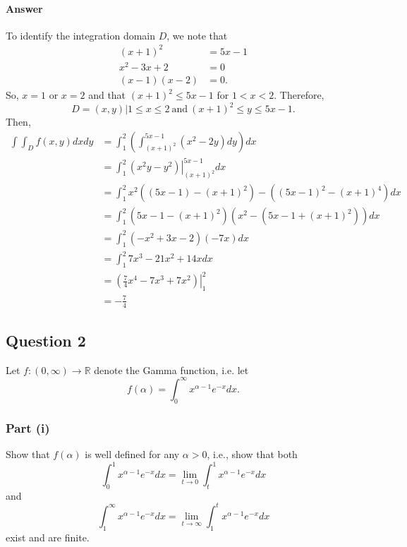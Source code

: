 \paragraph{Answer}
To identify the integration domain $ D $, we note that
\begin{align*}
    (x + 1)^2 &= 5 x - 1 \\
    x^2 - 3 x + 2 &= 0 \\
    (x - 1)(x - 2) &= 0.
\end{align*}
So, $ x = 1 $ or $ x = 2 $ and that $ (x + 1)^2 \leq 5 x - 1 $ for
    $ 1 < x < 2 $.
Therefore,
\begin{equation*}
    D = {(x, y) | 1 \leq x \leq 2\ \text{and}\ (x + 1)^2 \leq y \leq 5 x - 1}.
\end{equation*}
Then,
\begin{align*}
    \int \int_D f(x, y) dx dy
        &= \int_{1}^{2} \left( \int_{(x+1)^2}^{5x-1} (x^2 - 2y) dy \right) dx \\
        &= \int_{1}^{2} \left. \left( x^2 y - y^2 \right)
            \right|_{(x+1)^2}^{5x-1} dx \\
        &= \int_{1}^{2} x^2 ((5x - 1) - (x + 1)^2) - ((5x - 1)^2 - (x + 1)^4)
            dx \\
        &= \int_{1}^{2} (5x - 1 - (x + 1)^2)(x^2 - (5x - 1 + (x + 1)^2)) dx \\
        &= \int_{1}^{2} (-x^2 + 3x - 2)(-7x) dx \\
        &= \int_{1}^{2} 7x^3 - 21x^2 + 14x dx \\
        &= \left. \left( \frac{7}{4} x^4 - 7 x^3 + 7 x^2 \right) \right|_1^2 \\
        &= -\frac{7}{4}
\end{align*}

\subsection{Question 2}
Let $ f : (0, \infty) \rightarrow \mathbb{R} $ denote the Gamma function, i.e.
    let
\begin{equation*}
    f(\alpha) = \int_{0}^{\infty} x^{\alpha - 1} e^{-x} dx.
\end{equation*}

\subsubsection{Part (i)}
Show that $ f(\alpha) $ is well defined for any $ \alpha > 0 $, i.e., show that
    both
\begin{equation*}
    \int_{0}^{1} x^{\alpha - 1} e^{-x} dx = \lim_{t \rightarrow 0}
        \int_{t}^{1} x^{\alpha - 1} e^{-x} dx
\end{equation*}
and
\begin{equation*}
    \int_{1}^{\infty} x^{\alpha - 1} e^{-x} dx = \lim_{t \rightarrow \infty}
        \int_{1}^{t} x^{\alpha - 1} e^{-x} dx
\end{equation*}
exist and are finite.

